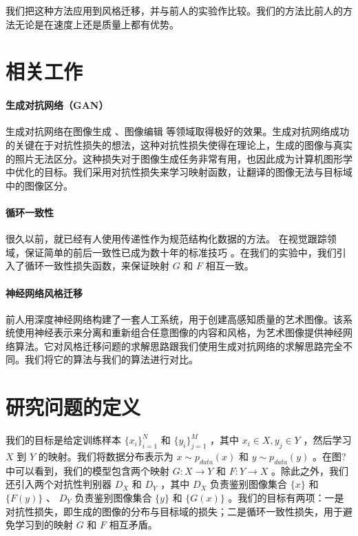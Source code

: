 \documentclass[conference]{IEEEtran}
\begin{document}
我们把这种方法应用到风格迁移，并与前人的实验作比较。我们的方法比前人的方法无论是在速度上还是质量上都有优势。

\section{相关工作}

\paragraph{生成对抗网络（GAN）\cite{b16}}
生成对抗网络在图像生成 \cite{b6}、图像编辑 \cite{b66} 等领域取得极好的效果。生成对抗网络成功的关键在于对抗性损失的想法，这种对抗性损失使得在理论上，生成的图像与真实的照片无法区分。这种损失对于图像生成任务非常有用，也因此成为计算机图形学中优化的目标。我们采用对抗性损失来学习映射函数，让翻译的图像无法与目标域中的图像区分。

\paragraph{循环一致性}
很久以前，就已经有人使用传递性作为规范结构化数据的方法。 在视觉跟踪领域，保证简单的前后一致性已成为数十年的标准技巧 \cite{b24} \cite{b48} 。在我们的实验中，我们引入了循环一致性损失函数，来保证映射 $G$ 和 $F$ 相互一致。

\paragraph{神经网络风格迁移 \cite{b13} \cite{b23}}
前人用深度神经网络构建了一套人工系统，用于创建高感知质量的艺术图像。该系统使用神经表示来分离和重新组合任意图像的内容和风格，为艺术图像提供神经网络算法。它对风格迁移问题的求解思路跟我们使用生成对抗网络的求解思路完全不同。我们将它的算法与我们的算法进行对比。



\section{研究问题的定义}

我们的目标是给定训练样本 $\{x_i\}_{i=1}^{N}$ 和 $\{y_i\}_{j=1}^{M}$ ，其中 $x_i \in X, y_j \in Y$ ，然后学习 $X$ 到 $Y$ 的映射。我们将数据分布表示为 $x \sim p_{data}(x)$ 和 $y \sim p_{data}(y)$  。在图?中可以看到，我们的模型包含两个映射 $G: X \rightarrow Y$ 和 $F: Y \rightarrow X$ 。除此之外，我们还引入两个对抗性判别器 $D_X$ 和 $D_Y$ ，其中 $D_X$ 负责鉴别图像集合 $\{x\}$ 和 $\{F(y)\}$ 、 $D_Y$ 负责鉴别图像集合 $\{y\}$ 和 $\{G(x)\}$ 。我们的目标有两项：一是对抗性损失，即生成的图像的分布与目标域的损失；二是循环一致性损失，用于避免学习到的映射 $G$ 和 $F$ 相互矛盾。
\end{document}
